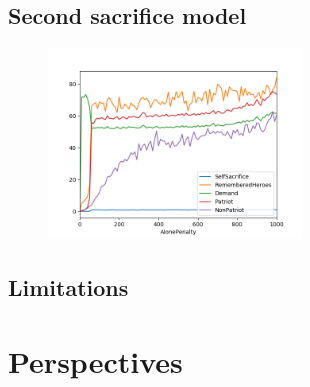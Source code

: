 \documentclass[a4paper,12pt]{report}
\begin{document}





\section{Second sacrifice model}



\begin{figure}[h]
    \centering
    \includegraphics[width=0.6\textwidth]{AP_allRGT_count20}
    \caption{}
    \label{fig:h}
    \end{figure}






\section{Limitations}

\chapter{Perspectives}

%
%


%
%
\end{document}
